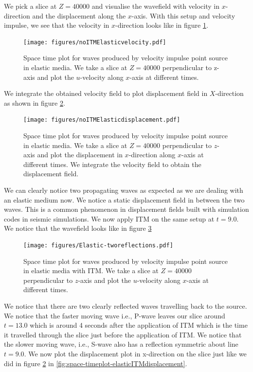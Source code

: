We pick a slice at $Z = 40000$ and visualise the wavefield with velocity in $x$-direction and the displacement along the $x$-axis. With this setup and velocity impulse, 
we see that the velocity in $x$-direction looks like in figure \ref{fig:space-timeplot-elasticnoITM}.

\begin{figure}[!htpb]
    \centering
    \texttt{[image: figures/noITMElasticvelocity.pdf]}
    \caption{Space time plot for waves produced by velocity impulse point source in elastic media. We take a slice at $Z=40000$ perpendicular to z-axis
    and plot the $u$-velocity along $x$-axis at different times.}
    \label{fig:space-timeplot-elasticnoITM}
\end{figure}

We integrate the obtained velocity field to plot displacement field in $X$-direction as shown in figure \ref{fig:space-timeplot-elasticnoITMdisplacement}.

\begin{figure}[!htpb]
    \centering
    \texttt{[image: figures/noITMElasticdisplacement.pdf]}
    \caption{Space time plot for waves produced by velocity impulse point source in elastic media. We take a slice at $Z=40000$ perpendicular to $z$-axis
    and plot the displacement in $x$-direction along $x$-axis at different times. We integrate the velocity field to obtain the displacement field.}
    \label{fig:space-timeplot-elasticnoITMdisplacement}
\end{figure}

We can clearly notice two propagating waves as expected as we are dealing with an elastic medium now. We notice a static displacement field in between the two waves.
This is a common phenomenon in displacement fields built with simulation codes in seismic simulations. 
We now apply \ac{ITM} on the same setup at $t=9.0$. We notice that the wavefield looks like in figure \ref{fig:space-timeplot-elasticITM}

\begin{figure}[!htpb]
    \centering
    \texttt{[image: figures/Elastic-tworeflections.pdf]}
    \caption{Space time plot for waves produced by velocity impulse point source in elastic media with \ac{ITM}. We take a slice at $Z=40000$ perpendicular to $z$-axis
    and plot the $u$-velocity along $x$-axis at different times.}
    \label{fig:space-timeplot-elasticITM}
\end{figure}

We notice that there are two clearly reflected waves travelling back to the source. We notice that the faster moving wave i.e., P-wave leaves our slice around 
$t=13.0$ which is around 4 seconds after the application of \ac{ITM} which is the time it travelled through the slice just before the application of \ac{ITM}. 
We notice that the slower moving wave, i.e., S-wave also has a reflection symmetric about line $t=9.0$. We now plot the displacement plot in x-direction on the 
slice just like we did in figure \ref{fig:space-timeplot-elasticnoITMdisplacement} in \ref{fig:space-timeplot-elasticITMdisplacement}.

